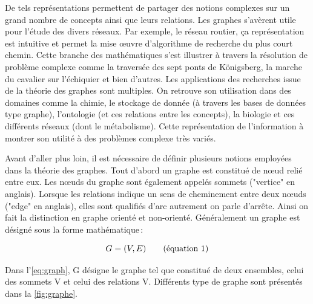 \begin{refsegment}
    De tels représentations permettent de partager des notions complexes sur un grand nombre de concepts ainsi que leurs relations. Les graphes s'avèrent utile pour l'étude des divers réseaux. Par exemple, le réseau routier, ça représentation est intuitive et permet la mise œuvre d'algorithme de recherche du plus court chemin. Cette branche des mathématiques s'est illustrer à travers la résolution  de problème complexe comme la traversée des sept ponts de Königsberg, la marche du cavalier sur l’échiquier et bien d'autres. Les applications des recherches issue de la théorie des graphes sont multiples. On retrouve son utilisation dans des domaines comme la chimie, le stockage de donnée (à travers les bases de données type graphe), l'ontologie (et ces relations entre les concepts), la biologie et ces différents réseaux (dont le métabolisme). Cette représentation de l'information à montrer son utilité à des problèmes complexe très variés.
    
    Avant d'aller plus loin, il est nécessaire de définir plusieurs notions employées dans la théorie des graphes. Tout d'abord un graphe est constitué de nœud relié entre eux. Les nœuds du graphe sont également appelés sommets ("vertice" en anglais).  Lorsque les relations indique un sens de cheminement entre deux nœuds ("edge" en anglais), elles sont qualifiés d'arc autrement on parle d'arrête. Ainsi on fait la distinction en graphe orienté et non-orienté. Généralement un graphe est désigné sous la forme mathématique :
    
    \begin{equation}\label{eq:graph}
    	G = (V,E) \stepcounter{equation}\tag{équation \theequation}
    \end{equation}
    
    Dans l'\cref{eq:graph}, G désigne le graphe tel que constitué de deux ensembles, celui des sommets V et celui des relations V. Différents type de graphe sont présentés dans la \cref{fig:graphe}.
    

\end{refsegment}
